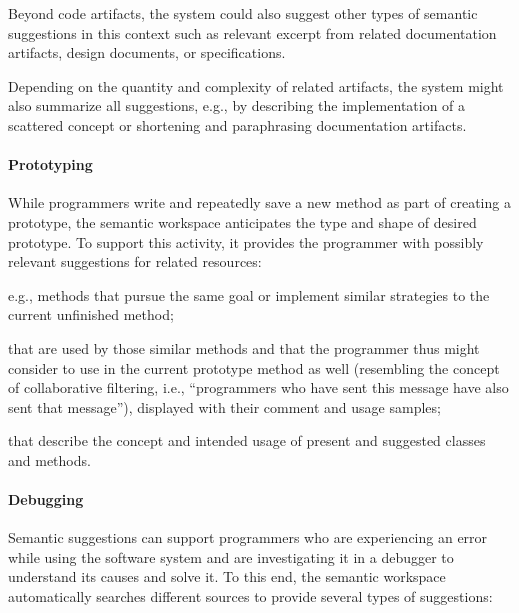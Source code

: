 	\noindent
	Beyond code artifacts, the system could also suggest other types of semantic suggestions in this context such as relevant excerpt from related documentation artifacts, design documents, or specifications.

	Depending on the quantity and complexity of related artifacts, the system might also summarize all suggestions, e.g., by describing the implementation of a scattered concept or shortening and paraphrasing documentation artifacts.

	\paragraph{Prototyping}
	While programmers write and repeatedly save a new method as part of creating a prototype, the semantic workspace anticipates the type and shape of desired prototype.
	To support this activity, it provides the programmer with possibly relevant suggestions for related resources:

	\begin{description}[noextralabelsep]
		\item[similar methods,] e.g., methods that pursue the same goal or implement similar strategies to the current unfinished method;
		\item[correlated methods and classes] that are used by those similar methods and that the programmer thus might consider to use in the current prototype method as well (resembling the concept of collaborative filtering, i.e., ``programmers who have sent this message have also sent that message''), displayed with their comment and usage samples;
		\item[documentation artifacts] that describe the concept and intended usage of present and suggested classes and methods.
	\end{description}

	\paragraph{Debugging}
	Semantic suggestions can support programmers who are experiencing an error while using the software system and are investigating it in a debugger to understand its causes and solve it.
	To this end, the semantic workspace automatically searches different sources to provide several types of suggestions:

